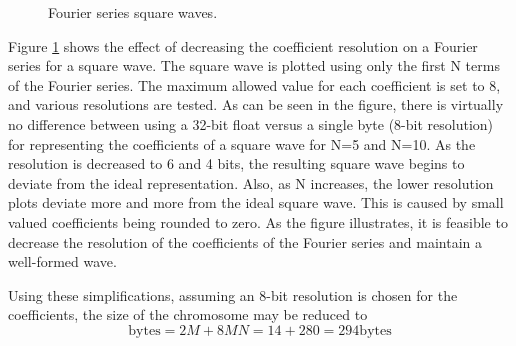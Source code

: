   \begin{figure}[!ht]
  \begin{center}
  \end{center}
  \caption{\label{fig:coefficient_resolution} Fourier series square waves.}
  \end{figure}

  Figure \ref{fig:coefficient_resolution} shows the effect of decreasing the coefficient
  resolution on a Fourier series for a square wave. The square wave is plotted using
  only the first N terms of the Fourier series. The maximum allowed value for
  each coefficient is set to 8, and
  various resolutions are tested. As can be seen in the figure, there is virtually no
  difference between using a 32-bit float versus a single byte (8-bit resolution) for
  representing the coefficients of a square wave for N=5 and N=10. As the
  resolution is decreased to 6 and 4
  bits, the resulting square wave begins to deviate from the ideal representation.
  Also, as N increases, the lower resolution plots deviate more and more from the ideal
  square wave. This is caused by small valued coefficients being rounded to zero. 
  As the figure illustrates, it is feasible to decrease the resolution of the coefficients
  of the Fourier series and maintain a well-formed wave. 

  Using these
  simplifications, assuming an 8-bit resolution is chosen for the coefficients,
  the size of the chromosome may be reduced to
  \begin{equation}
  \mathrm{bytes} = 2M + 8MN = 14 + 280 = 294 \mathrm{bytes}
  \end{equation}

